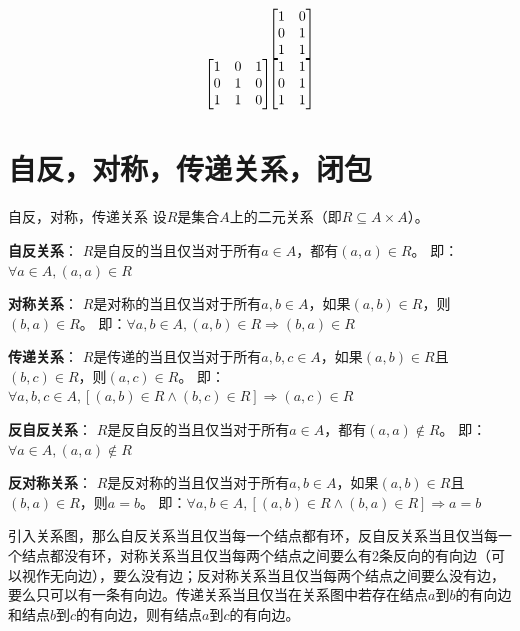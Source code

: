 \documentclass[lang=cn,11pt]{elegantbook}
\begin{document}
\[
\begin{array}{c@{\hspace{-2pt}}c}
 & 
\begin{bmatrix}
1 & 0 \\
0 & 1 \\
1 & 1
\end{bmatrix} \\[8pt]
\begin{bmatrix}
1 & 0 & 1 \\
0 & 1 & 0 \\
1 & 1 & 0
\end{bmatrix} & 
\begin{bmatrix}
1 & 1 \\
0 & 1 \\
1 & 1
\end{bmatrix}
\end{array}
\]
\section{自反，对称，传递关系，闭包}
\begin{definition}{自反，对称，传递关系}
设$R$是集合$A$上的二元关系（即$R \subseteq A \times A$）。

\textbf{自反关系}：
$R$是自反的当且仅当对于所有$a \in A$，都有$(a,a) \in R$。
即：$\forall a \in A, (a,a) \in R$

\textbf{对称关系}：
$R$是对称的当且仅当对于所有$a,b \in A$，如果$(a,b) \in R$，则$(b,a) \in R$。
即：$\forall a,b \in A, (a,b) \in R \Rightarrow (b,a) \in R$

\textbf{传递关系}：
$R$是传递的当且仅当对于所有$a,b,c \in A$，如果$(a,b) \in R$且$(b,c) \in R$，则$(a,c) \in R$。
即：$\forall a,b,c \in A, [(a,b) \in R \land (b,c) \in R] \Rightarrow (a,c) \in R$

\textbf{反自反关系}：
$R$是反自反的当且仅当对于所有$a \in A$，都有$(a,a) \notin R$。
即：$\forall a \in A, (a,a) \notin R$

\textbf{反对称关系}：
$R$是反对称的当且仅当对于所有$a,b \in A$，如果$(a,b) \in R$且$(b,a) \in R$，则$a = b$。
即：$\forall a,b \in A, [(a,b) \in R \land (b,a) \in R] \Rightarrow a = b$
\end{definition}
引入关系图，那么自反关系当且仅当每一个结点都有环，反自反关系当且仅当每一个结点都没有环，对称关系当且仅当每两个结点之间要么有2条反向的有向边（可以视作无向边），要么没有边；反对称关系当且仅当每两个结点之间要么没有边，要么只可以有一条有向边。传递关系当且仅当在关系图中若存在结点$a$到$b$的有向边和结点$b$到$c$的有向边，则有结点$a$到$c$的有向边。
\end{document}
